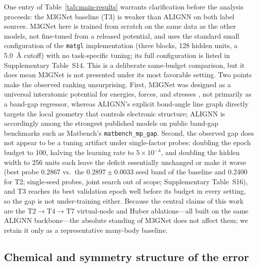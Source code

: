 \documentclass[a4paper,11pt]{article}
\begin{document}
One entry of Table~\ref{tab:main-results} warrants clarification before the analysis proceeds: the M3GNet baseline (T3) is weaker than ALIGNN on both label sources. M3GNet here is trained from scratch on the same data as the other models, not fine-tuned from a released potential, and uses the standard small configuration of the \texttt{matgl} implementation (three blocks, 128 hidden units, a 5.0~\AA{} cutoff) with no task-specific tuning; its full configuration is listed in Supplementary Table~S14. This is a deliberate same-budget comparison, but it does mean M3GNet is not presented under its most favorable setting. Two points make the observed ranking unsurprising. First, M3GNet was designed as a universal interatomic potential for energies, forces, and stresses \cite{chen2022m3gnet}, not primarily as a band-gap regressor, whereas ALIGNN's explicit bond-angle line graph directly targets the local geometry that controls electronic structure; ALIGNN is accordingly among the strongest published models on public band-gap benchmarks such as Matbench's \texttt{matbench\_mp\_gap}. Second, the observed gap does not appear to be a tuning artifact under single-factor probes: doubling the epoch budget to 100, halving the learning rate to \(5\times10^{-4}\), and doubling the hidden width to 256 units each leave the deficit essentially unchanged or make it worse (best probe 0.2867 vs.\ the \(0.2897\pm0.0033\) seed band of the baseline and 0.2400 for T2; single-seed probes, joint search out of scope; Supplementary Table~S16), and T3 reaches its best validation epoch well before its budget in every setting, so the gap is not under-training either. Because the central claims of this work are the T2\(\rightarrow\)T4\(\rightarrow\)T7 virtual-node and Huber ablations---all built on the same ALIGNN backbone---the absolute standing of M3GNet does not affect them; we retain it only as a representative many-body baseline.

\subsection{Chemical and symmetry structure of the error}
\label{sec:physics-analysis}
\end{document}
